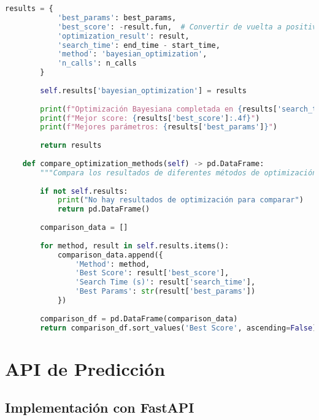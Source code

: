 \begin{lstlisting}[language=Python, caption=Sistema de optimización de hiperparámetros]
        results = {
            'best_params': best_params,
            'best_score': -result.fun,  # Convertir de vuelta a positivo
            'optimization_result': result,
            'search_time': end_time - start_time,
            'method': 'bayesian_optimization',
            'n_calls': n_calls
        }
        
        self.results['bayesian_optimization'] = results
        
        print(f"Optimización Bayesiana completada en {results['search_time']:.2f} segundos")
        print(f"Mejor score: {results['best_score']:.4f}")
        print(f"Mejores parámetros: {results['best_params']}")
        
        return results
    
    def compare_optimization_methods(self) -> pd.DataFrame:
        """Compara los resultados de diferentes métodos de optimización"""
        
        if not self.results:
            print("No hay resultados de optimización para comparar")
            return pd.DataFrame()
        
        comparison_data = []
        
        for method, result in self.results.items():
            comparison_data.append({
                'Method': method,
                'Best Score': result['best_score'],
                'Search Time (s)': result['search_time'],
                'Best Params': str(result['best_params'])
            })
        
        comparison_df = pd.DataFrame(comparison_data)
        return comparison_df.sort_values('Best Score', ascending=False)
\end{lstlisting}

\section{API de Predicción}

\subsection{Implementación con FastAPI}

